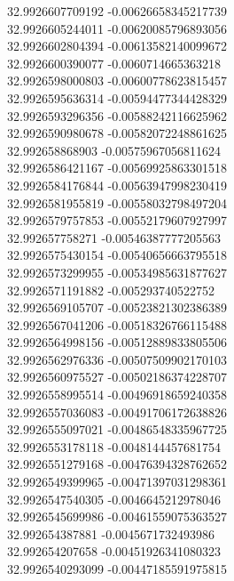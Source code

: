{32.9926607709192	-0.00626658345217739\\
32.9926605244011	-0.00620085796893056\\
32.9926602804394	-0.00613582140099672\\
32.9926600390077	-0.0060714665363218\\
32.9926598000803	-0.00600778623815457\\
32.9926595636314	-0.00594477344428329\\
32.9926593296356	-0.00588242116625962\\
32.9926590980678	-0.00582072248861625\\
32.992658868903	-0.00575967056811624\\
32.9926586421167	-0.00569925863301518\\
32.9926584176844	-0.00563947998230419\\
32.9926581955819	-0.00558032798497204\\
32.9926579757853	-0.00552179607927997\\
32.992657758271	-0.00546387777205563\\
32.9926575430154	-0.00540656663795518\\
32.9926573299955	-0.00534985631877627\\
32.9926571191882	-0.005293740522752\\
32.9926569105707	-0.00523821302386389\\
32.9926567041206	-0.00518326766115488\\
32.9926564998156	-0.00512889833805506\\
32.9926562976336	-0.00507509902170103\\
32.9926560975527	-0.00502186374228707\\
32.9926558995514	-0.00496918659240358\\
32.9926557036083	-0.00491706172638826\\
32.9926555097021	-0.00486548335967725\\
32.9926553178118	-0.0048144457681754\\
32.9926551279168	-0.00476394328762652\\
32.9926549399965	-0.00471397031298361\\
32.9926547540305	-0.0046645212978046\\
32.9926545699986	-0.00461559075363527\\
32.992654387881	-0.0045671732493986\\
32.992654207658	-0.00451926341080323\\
32.9926540293099	-0.00447185591975815\\
}
